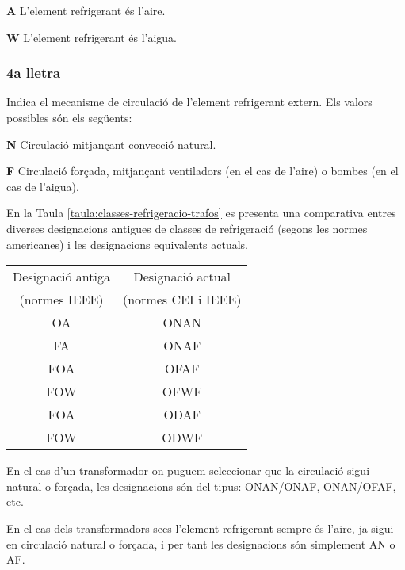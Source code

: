 \begin{list}{}
   {\setlength{\labelwidth}{10mm} \setlength{\leftmargin}{10mm} \setlength{\labelsep}{2mm}}
   \item[\textbf{A}] L'element refrigerant és l'aire.
   \item[\textbf{W}] L'element refrigerant és l'aigua.
\end{list}
 

\subsubsection*{4a lletra}
 Indica el mecanisme de circulació de l'element
refrigerant extern. Els valors possibles són els següents:
\begin{list}{}
   {\setlength{\labelwidth}{10mm} \setlength{\leftmargin}{10mm} \setlength{\labelsep}{2mm}}
   \item[\textbf{N}] Circulació mitjançant convecció natural.
   \item[\textbf{F}] Circulació forçada, mitjançant ventiladors (en el cas de
   l'aire) o bombes (en el cas de l'aigua).
\end{list}
 

En la Taula \vref{taula:classes-refrigeracio-trafos} es presenta una
comparativa entres diverses designacions antigues de classes de
refrigeració (segons les normes americanes) i les designacions
equivalents actuals.

\begin{center}
   \label{taula:classes-refrigeracio-trafos}
   \begin{tabular}{cc}
   \toprule[1pt]
   Designació antiga & Designació actual \\
   (normes IEEE)     & (normes CEI i IEEE) \\
   \midrule
   OA & ONAN   \\
   FA & ONAF   \\
   FOA & OFAF  \\
   FOW & OFWF  \\
   FOA & ODAF  \\
   FOW & ODWF \\
   \bottomrule[1pt]
   \end{tabular}
\end{center}

En el cas d'un transformador on puguem seleccionar que la circulació
sigui natural o forçada,
les designacions són del tipus: ONAN/ONAF, ONAN/OFAF, etc.

En el cas dels transformadors secs l'element refrigerant sempre és
l'aire, ja sigui en circulació natural o forçada, i per tant les
designacions són simplement AN o AF.





